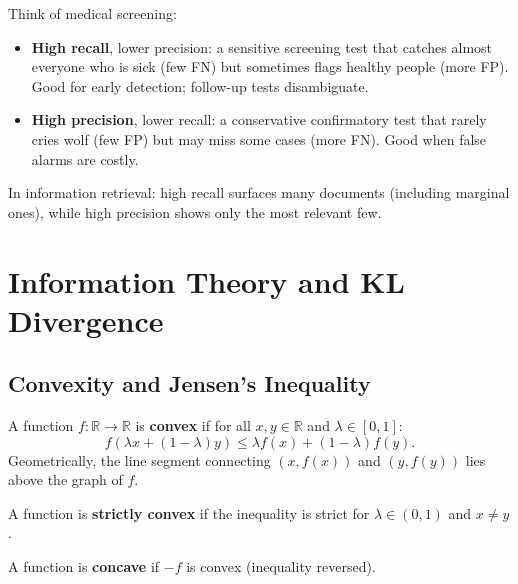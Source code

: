 \begin{remark}
    Think of medical screening:
    \begin{itemize}
        \item \textbf{High recall}, lower precision: a sensitive screening test that catches almost everyone who is sick (few FN) but sometimes flags healthy people (more FP). Good for early detection; follow-up tests disambiguate.
        \item \textbf{High precision}, lower recall: a conservative confirmatory test that rarely cries wolf (few FP) but may miss some cases (more FN). Good when false alarms are costly.
    \end{itemize}
    In information retrieval: high recall surfaces many documents (including marginal ones), while high precision shows only the most relevant few.
\end{remark}

\section{Information Theory and KL Divergence}

\subsection{Convexity and Jensen's Inequality}

\begin{definition}
    A function $f: \mathbb{R} \to \mathbb{R}$ is \textbf{convex} if for all $x, y \in \mathbb{R}$ and $\lambda \in [0,1]$:
    \[
        f(\lambda x + (1-\lambda) y) \leq \lambda f(x) + (1-\lambda) f(y).
    \]
    Geometrically, the line segment connecting $(x, f(x))$ and $(y, f(y))$ lies above the graph of $f$.

    A function is \textbf{strictly convex} if the inequality is strict for $\lambda \in (0,1)$ and $x \neq y$.

    A function is \textbf{concave} if $-f$ is convex (inequality reversed).
\end{definition}

